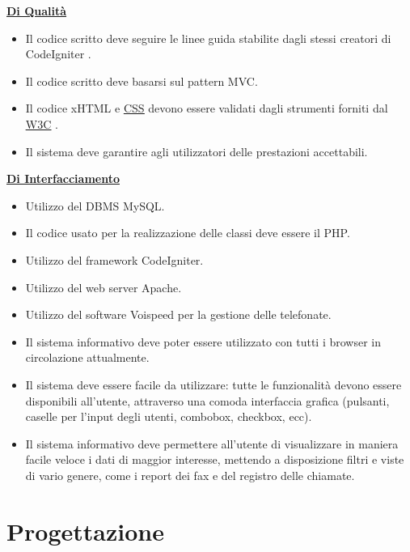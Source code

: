 \underline{\textbf{Di Qualit\`a}}
\begin{itemize}
\item Il codice scritto deve seguire le linee guida stabilite dagli stessi creatori di CodeIgniter \cite{cistyle}.
\item Il codice scritto deve basarsi sul pattern MVC.
\item Il codice xHTML e \hyperlink{css}{\underline{CSS}} devono essere validati dagli strumenti forniti dal \hyperlink{w3c}{\underline{W3C}} \cite{due}.
\item Il sistema deve garantire agli utilizzatori delle prestazioni accettabili.
\end{itemize}

\underline{\textbf{Di Interfacciamento}}
\begin{itemize}
	  \item Utilizzo del DBMS MySQL.
	  \item Il codice usato per la realizzazione delle classi deve essere il PHP.			
	  \item Utilizzo del framework CodeIgniter.
	  \item Utilizzo del web server Apache.
	  \item Utilizzo del software Voispeed per la gestione delle telefonate.
	  \item Il sistema informativo deve poter essere utilizzato con tutti i browser in circolazione attualmente.
	  \item Il sistema deve essere facile da utilizzare: tutte le funzionalit\`a devono essere disponibili all’utente, attraverso una comoda interfaccia grafica (pulsanti, caselle per l’input degli utenti, combobox, checkbox, ecc).
	  \item Il sistema informativo deve permettere all’utente di visualizzare in maniera facile veloce i dati di maggior interesse, mettendo a disposizione filtri e viste di vario genere, come i report dei fax e del registro delle chiamate.
\end{itemize}

\newpage
\section{Progettazione}
